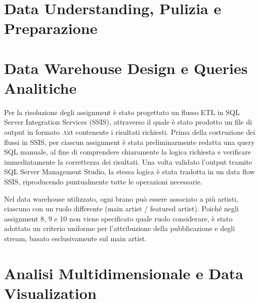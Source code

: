 

\section*{Data Understanding, Pulizia e Preparazione}








\section*{Data Warehouse Design e Queries Analitiche}

Per la risoluzione degli assignment è stato progettato un flusso ETL
in SQL Server Integration Services (SSIS), attraverso il quale è stato
prodotto un file di output in formato .txt contenente i risultati
richiesti.
Prima della costruzione dei flussi in SSIS, per ciascun assignment è
stata preliminarmente redatta una query SQL manuale, al fine di
comprendere chiaramente la logica richiesta e verificare immediatamente
la correttezza dei risultati. Una volta validato l'output tramite SQL
Server Management Studio, la stessa logica è stata tradotta in un data
flow SSIS, riproducendo puntualmente tutte le operazioni necessarie.

Nel data warehouse utilizzato, ogni brano può essere associato a più
artisti, ciascuno con un ruolo differente (main artist /
featured artist). Poiché negli assignment 8, 9 e 10 non viene specificato
quale ruolo considerare, è stato adottato un criterio uniforme per
l'attribuzione della pubblicazione e degli stream, basato esclusivamente
sul main artist.








\section*{Analisi Multidimensionale e Data Visualization}



 
  




